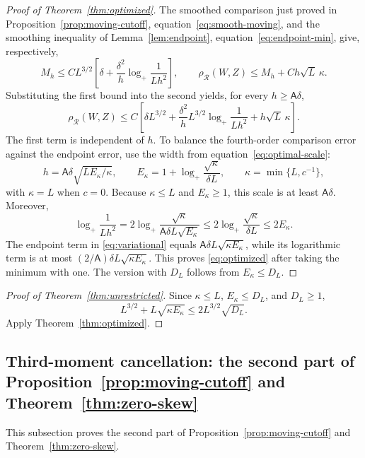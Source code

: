 \documentclass[11pt,letterpaper]{article}
\newcommand{\Ac}{\mathsf A}
\theoremstyle{remark}
\newcommand{\rh}{\rho_{\mathcal R}}
\begin{document}
\begin{proof}[Proof of Theorem~\ref{thm:optimized}]
The smoothed comparison just proved in
Proposition~\ref{prop:moving-cutoff}, equation~\eqref{eq:smooth-moving},
and the smoothing inequality of Lemma~\ref{lem:endpoint},
equation~\eqref{eq:endpoint-min}, give, respectively,
\[
 M_h\le CL^{3/2}\left[\delta+\frac{\delta^2}{h}
          \log_+\frac1{Lh^2}\right],
 \qquad \rh(W,Z)\le M_h+Ch\sqrt L\,\kappa.
\]
Substituting the first bound into the second yields, for every
\(h\ge\Ac\delta\),
\begin{equation}
 \rh(W,Z)\le C\left[
 \delta L^{3/2}
 +\frac{\delta^2}{h}L^{3/2}\log_+\frac1{Lh^2}
 +h\sqrt L\,\kappa\right].
 \label{eq:variational}
\end{equation}
The first term is independent of \(h\). To balance the fourth-order
comparison error against the endpoint error, use the width from
equation~\eqref{eq:optimal-scale}:
\[
 h=\Ac\delta\sqrt{LE_\kappa/\kappa},\qquad
 E_\kappa=1+\log_+\frac{\sqrt\kappa}{\delta L},\qquad
 \kappa=\min\{L,c^{-1}\},
\]
with \(\kappa=L\) when \(c=0\). Because \(\kappa\le L\) and \(E_\kappa\ge1\), this scale is at least
\(\Ac\delta\). Moreover,
\[
 \log_+\frac1{Lh^2}
 =2\log_+\frac{\sqrt\kappa}{\Ac\delta L\sqrt{E_\kappa}}
 \le2\log_+\frac{\sqrt\kappa}{\delta L}
 \le2E_\kappa.
\]
The endpoint term in \eqref{eq:variational} equals
\(\Ac\delta L\sqrt{\kappa E_\kappa}\), while its logarithmic term is at
most \((2/\Ac)\delta L\sqrt{\kappa E_\kappa}\).
This proves \eqref{eq:optimized} after taking the minimum with one.
The version with \(D_L\) follows from \(E_\kappa\le D_L\).
\end{proof}

\begin{proof}[Proof of Theorem~\ref{thm:unrestricted}]
Since \(\kappa\le L\), \(E_\kappa\le D_L\), and \(D_L\ge1\),
\[
 L^{3/2}+L\sqrt{\kappa E_\kappa}
 \le 2L^{3/2}\sqrt{D_L}.
\]
Apply Theorem~\ref{thm:optimized}.
\end{proof}

\subsection{\texorpdfstring{Third-moment cancellation: the second part of Proposition~\ref{prop:moving-cutoff} and Theorem~\ref{thm:zero-skew}}{Third-moment cancellation: the second part of Proposition 2 and Theorem 3}}\label{zs:section}
This subsection proves the second part of
Proposition~\ref{prop:moving-cutoff} and Theorem~\ref{thm:zero-skew}.
\end{document}

